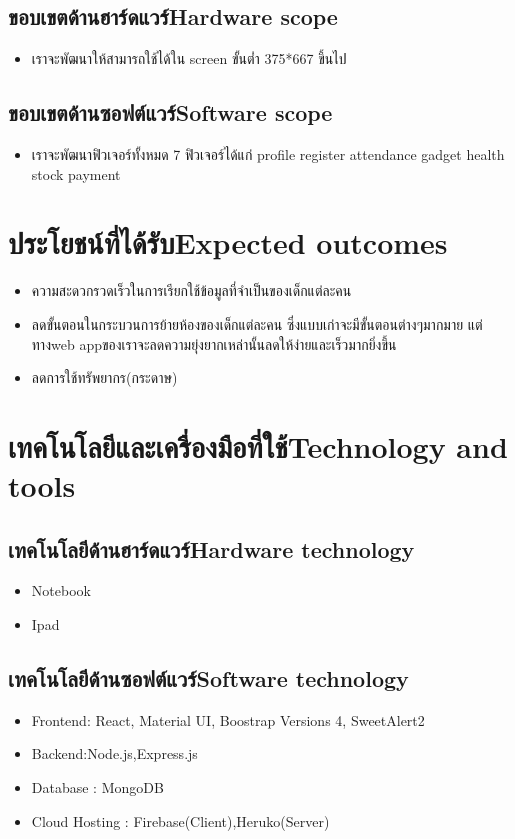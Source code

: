 \subsection{\ifcpe ขอบเขตด้านฮาร์ดแวร์\else Hardware scope\fi}
\begin{itemize}
    \item เราจะพัฒนาให้สามารถใช้ได้ใน screen ขั้นต่ำ 375*667 ขึ้นไป 
\end{itemize}

\subsection{\ifcpe ขอบเขตด้านซอฟต์แวร์\else Software scope\fi}
\begin{itemize}
    \item เราจะพัฒนาฟิวเจอร์ทั้งหมด 7 ฟิวเจอร์ได้แก่ profile register attendance gadget health stock payment  
\end{itemize}

\section{\ifcpe ประโยชน์ที่ได้รับ\else Expected outcomes\fi}
\begin{itemize}
\item ความสะดวกรวดเร็วในการเรียกใช้ข้อมูลที่จำเป็นของเด็กแต่ละคน
\item ลดขั้นตอนในกระบวนการย้ายห้องของเด็กแต่ละคน ซึ่งแบบเก่าจะมีขั้นตอนต่างๆมากมาย
 แต่ทางweb appของเราจะลดความยุ่งยากเหล่านั้นลดให้ง่ายและเร็วมากยิ่งขึ้น
 \item ลดการใช้ทรัพยากร(กระดาษ)

\end{itemize}

\section{\ifcpe เทคโนโลยีและเครื่องมือที่ใช้\else Technology and tools\fi}

\subsection{\ifcpe เทคโนโลยีด้านฮาร์ดแวร์\else Hardware technology\fi}
\begin{itemize}
    \item Notebook
    \item Ipad
\end{itemize}

\subsection{\ifcpe เทคโนโลยีด้านซอฟต์แวร์\else Software technology\fi}
\begin{itemize}
    \item Frontend: React, Material UI, Boostrap Versions 4, SweetAlert2		
    \item Backend:Node.js,Express.js
    \item Database : MongoDB
    \item  Cloud Hosting : Firebase(Client),Heruko(Server)
\end{itemize}



